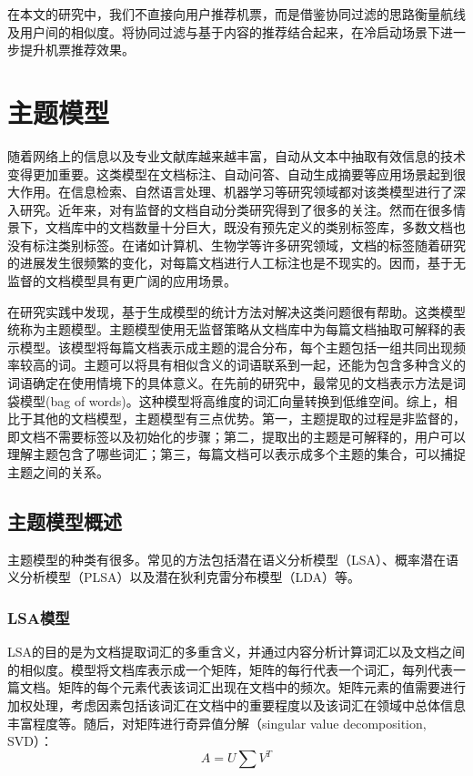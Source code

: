 在本文的研究中，我们不直接向用户推荐机票，而是借鉴协同过滤的思路衡量航线及用户间的相似度。将协同过滤与基于内容的推荐结合起来，在冷启动场景下进一步提升机票推荐效果。

\section{主题模型}

随着网络上的信息以及专业文献库越来越丰富，自动从文本中抽取有效信息的技术变得更加重要。这类模型在文档标注、自动问答、自动生成摘要等应用场景起到很大作用。在信息检索、自然语言处理、机器学习等研究领域都对该类模型进行了深入研究。近年来，对有监督的文档自动分类研究得到了很多的关注\cite{yang1999evaluation}。然而在很多情景下，文档库中的文档数量十分巨大，既没有预先定义的类别标签库，多数文档也没有标注类别标签。在诸如计算机、生物学等许多研究领域，文档的标签随着研究的进展发生很频繁的变化，对每篇文档进行人工标注也是不现实的。因而，基于无监督的文档模型具有更广阔的应用场景。

在研究实践中发现，基于生成模型\cite{zhong2005generative,hofmann1999probabilistic,blei2003latent,minka2002expectation}的统计方法对解决这类问题很有帮助。这类模型统称为主题模型。主题模型使用无监督策略从文档库中为每篇文档抽取可解释的表示模型。该模型将每篇文档表示成主题的混合分布，每个主题包括一组共同出现频率较高的词。主题可以将具有相似含义的词语联系到一起，还能为包含多种含义的词语确定在使用情境下的具体意义。在先前的研究中，最常见的文档表示方法是词袋模型(bag of words)\cite{zhang2010understanding}。这种模型将高维度的词汇向量转换到低维空间。综上，相比于其他的文档模型，主题模型有三点优势。第一，主题提取的过程是非监督的，即文档不需要标签以及初始化的步骤；第二，提取出的主题是可解释的，用户可以理解主题包含了哪些词汇；第三，每篇文档可以表示成多个主题的集合，可以捕捉主题之间的关系。


\subsection{主题模型概述}

主题模型的种类有很多。常见的方法包括潜在语义分析模型（LSA）、概率潜在语义分析模型（PLSA）以及潜在狄利克雷分布模型（LDA）等。

\subsubsection{LSA模型}
LSA\cite{deerwester1990indexing}的目的是为文档提取词汇的多重含义，并通过内容分析计算词汇以及文档之间的相似度。模型将文档库表示成一个矩阵，矩阵的每行代表一个词汇，每列代表一篇文档。矩阵的每个元素代表该词汇出现在文档中的频次。矩阵元素的值需要进行加权处理，考虑因素包括该词汇在文档中的重要程度以及该词汇在领域中总体信息丰富程度等。随后，对矩阵进行奇异值分解（singular value decomposition, SVD）\cite{golub1970singular}：
\begin{equation}
	A = U\sum V^T
\end{equation}


